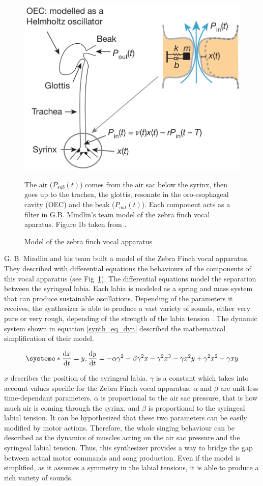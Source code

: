 \documentclass{report}
\begin{document}
\begin{figure}[htbp]
  {\center
  \includegraphics[width=0.5\linewidth]{media/scheme_vocal_apparatus}
  \caption{Model of the zebra finch vocal apparatus\label{zf-vocal-aparatus}}}
  \small

  The air (\(P_{sub}(t)\)) comes from the air sac below the syrinx, then goes up
  to the trachea, the glottis, resonate in the oro-esophageal cavity (OEC) and
  the beak (\(P_{out}(t)\)). Each component acts as a filter in G.B. Mindlin's
  team model of the zebra finch vocal aparatus. Figure 1b taken from
  \textcite{amador_elemental_2013}.

\end{figure}

G. B. Mindlin and his team built a model of the Zebra Finch vocal apparatus.
They described with differential equations the behaviours of the components of
this vocal apparatus (see Fig~\ref{zf-vocal-aparatus}). The differential
equations model the separation between the syringeal labia. Each labia is
modeled as a spring and mass system that can produce sustainable oscillations.
Depending of the parameters it receives, the synthesizer is able to produce a
vast variety of sounds, either very pure or very rough, depending of the
strength of the labia tension \parencite{amador_beyond_2008,
boari_automatic_2015}. The dynamic system shown in equation \ref{synth_eq_dyn} described the mathematical simplification of their model.

\begin{equation}
\systeme*{
\dv{x}{t} = y,
\dv{y}{t} = - \alpha \gamma^2 - \beta \gamma^2 x - \gamma^2 x^3 - \gamma x^2 y
    + \gamma^2 x^2 - \gamma x y
}
\label{synth_eq_dyn}
\end{equation}

\(x\) describes the position of the syringeal labia. \(\gamma\) is a constant
which takes into account values specific for the Zebra Finch vocal apparatus.
\(\alpha\) and \(\beta\) are unit-less time-dependant parameters. \(\alpha\) is
proportional to the air sac pressure, that is how much air is coming through the
syrinx, and \(\beta\) is proportional to the syringeal labial tension. It can be
hypothesized that these two parameters can be easily modified by motor actions.
Therefore, the whole singing behaviour can be described as the dynamics of
muscles acting on the air sac pressure and the syringeal labial tension. Thus,
this synthesizer provides a way to bridge the gap between actual motor commands
and song production. Even if the model is simplified, as it assumes a symmetry
in the labial tensions, it is able to produce a rich variety of sounds.
\end{document}
